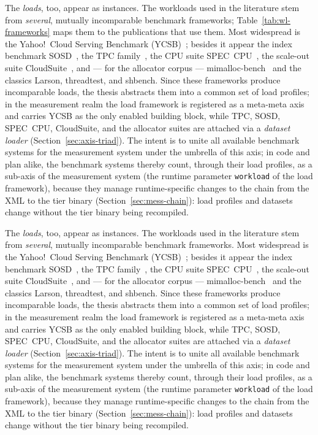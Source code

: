 \begin{nurlang}
The \emph{loads}, too, appear as instances. The workloads used in the literature stem from
\emph{several}, mutually incomparable benchmark frameworks; Table~\ref{tab:wl-frameworks}
maps them to the publications that use them. Most widespread is the Yahoo!\ Cloud Serving Benchmark
(YCSB)~\cite{cooper2010ycsb}; besides it appear the index benchmark SOSD~\cite{kipf2019sosd}, the
TPC family~\cite{tpc_benchmarks}, the CPU suite SPEC~CPU~\cite{spec_cpu2017}, the scale-out suite
CloudSuite~\cite{ferdman2012cloudsuite}, and --- for the allocator corpus ---
mimalloc-bench~\cite{mimalloc_bench} and the classics Larson, threadtest, and shbench. Since these
frameworks produce incomparable loads, the thesis abstracts them into a common set of
load profiles; in the measurement realm the load framework is registered as a meta-meta axis and carries YCSB as
the only enabled building block, while TPC, SOSD, SPEC~CPU, CloudSuite, and the allocator suites
are attached via a \emph{dataset loader} (Section~\ref{sec:axis-triad}).
The intent is to unite all available benchmark systems for the measurement system under the umbrella of this
axis; in code and plan alike, the benchmark systems thereby count, through their load profiles, as a
sub-axis of the measurement system (the runtime parameter \texttt{workload} of the load framework), because
they manage runtime-specific changes to the chain from the XML to the tier binary
(Section~\ref{sec:mess-chain}): load profiles and datasets change without the tier binary being recompiled.
\end{nurlang}
\begin{nurkurz}
The \emph{loads}, too, appear as instances. The workloads used in the literature stem from \emph{several},
mutually incomparable benchmark frameworks. Most widespread is the Yahoo!\ Cloud Serving Benchmark
(YCSB)~\cite{cooper2010ycsb}; besides it appear the index benchmark SOSD~\cite{kipf2019sosd}, the
TPC family~\cite{tpc_benchmarks}, the CPU suite SPEC~CPU~\cite{spec_cpu2017}, the scale-out suite
CloudSuite~\cite{ferdman2012cloudsuite}, and --- for the allocator corpus ---
mimalloc-bench~\cite{mimalloc_bench} and the classics Larson, threadtest, and shbench. Since these
frameworks produce incomparable loads, the thesis abstracts them into a common set of load profiles; in the
measurement realm the load framework is registered as a meta-meta axis and carries YCSB as the only enabled
building block, while TPC, SOSD, SPEC~CPU, CloudSuite, and the allocator suites are attached via a
\emph{dataset loader} (Section~\ref{sec:axis-triad}).
The intent is to unite all available benchmark systems for the measurement system under the umbrella of this
axis; in code and plan alike, the benchmark systems thereby count, through their load profiles, as a
sub-axis of the measurement system (the runtime parameter \texttt{workload} of the load framework), because
they manage runtime-specific changes to the chain from the XML to the tier binary
(Section~\ref{sec:mess-chain}): load profiles and datasets change without the tier binary being recompiled.
\end{nurkurz}

